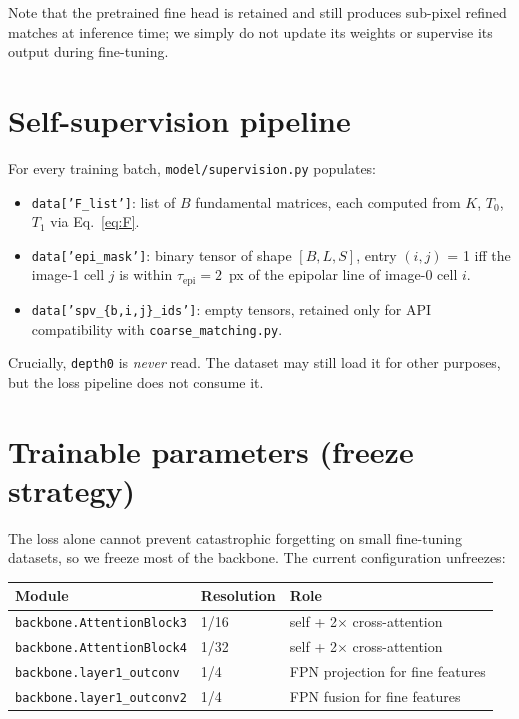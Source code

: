 \documentclass[11pt]{article}
\begin{document}
Note that the pretrained fine head is retained and still produces
sub-pixel refined matches at inference time; we simply do not update its
weights or supervise its output during fine-tuning.

\section{Self-supervision pipeline}

For every training batch, \texttt{model/supervision.py} populates:
\begin{itemize}[leftmargin=*]
  \item \texttt{data['F\_list']}: list of $B$ fundamental matrices, each
        computed from $K$, $T_0$, $T_1$ via Eq.~\eqref{eq:F}.
  \item \texttt{data['epi\_mask']}: binary tensor of shape $[B, L, S]$,
        entry $(i,j)$ = 1 iff the image-1 cell $j$ is within
        $\tau_{\text{epi}} = 2$~px of the epipolar line of image-0 cell $i$.
  \item \texttt{data['spv\_\{b,i,j\}\_ids']}: empty tensors, retained
        only for API compatibility with \texttt{coarse\_matching.py}.
\end{itemize}

Crucially, \texttt{depth0} is \emph{never} read. The dataset may still
load it for other purposes, but the loss pipeline does not consume it.

\section{Trainable parameters (freeze strategy)}

The loss alone cannot prevent catastrophic forgetting on small
fine-tuning datasets, so we freeze most of the backbone. The current
configuration unfreezes:

\begin{center}
\begin{tabular}{lll}
\toprule
Module & Resolution & Role \\
\midrule
\texttt{backbone.AttentionBlock3} & 1/16 & self + 2$\times$ cross-attention \\
\texttt{backbone.AttentionBlock4} & 1/32 & self + 2$\times$ cross-attention \\
\texttt{backbone.layer1\_outconv}  & 1/4  & FPN projection for fine features \\
\texttt{backbone.layer1\_outconv2} & 1/4  & FPN fusion for fine features \\
\bottomrule
\end{tabular}
\end{center}
\end{document}
